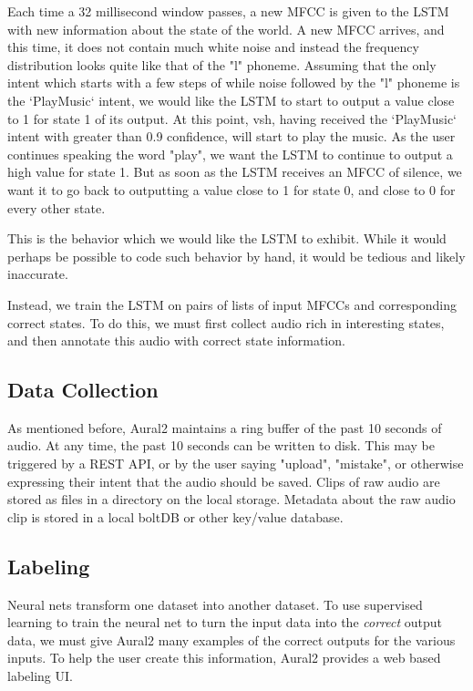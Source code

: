 \documentclass[conference]{IEEEtran}
\begin{document}
Each time a 32 millisecond window passes, a new MFCC is given to the LSTM with new information about the state of the world.
A new MFCC arrives, and this time, it does not contain much white noise and instead the frequency distribution looks quite like that of the "l" phoneme.
Assuming that the only intent which starts with a few steps of while noise followed by the "l" phoneme is the `PlayMusic` intent, we would like the LSTM to start to output a value close to 1 for state 1 of its output.
At this point, vsh, having received the `PlayMusic` intent with greater than 0.9 confidence, will start to play the music.
As the user continues speaking the word "play", we want the LSTM to continue to output a high value for state 1.
But as soon as the LSTM receives an MFCC of silence, we want it to go back to outputting a value close to 1 for state 0, and close to 0 for every other state.

This is the behavior which we would like the LSTM to exhibit.
While it would perhaps be possible to code such behavior by hand, it would be tedious and likely inaccurate.

Instead, we train the LSTM on pairs of lists of input MFCCs and corresponding correct states.
To do this, we must first collect audio rich in interesting states, and then annotate this audio with correct state information.

\subsection{Data Collection}

As mentioned before, Aural2 maintains a ring buffer of the past 10 seconds of audio. At any time, the past 10 seconds can be written to disk.
This may be triggered by a REST API, or by the user saying "upload", "mistake", or otherwise expressing their intent that the audio should be saved.
Clips of raw audio are stored as files in a directory on the local storage.
Metadata about the raw audio clip is stored in a local boltDB or other key/value database.

\subsection{Labeling}
Neural nets transform one dataset into another dataset. To use
supervised learning to train the neural net to turn the input data into
the \textit{correct} output data, we must give Aural2 many examples of the
correct outputs for the various inputs. To help the user create this
information, Aural2 provides a web based labeling UI.
\end{document}

